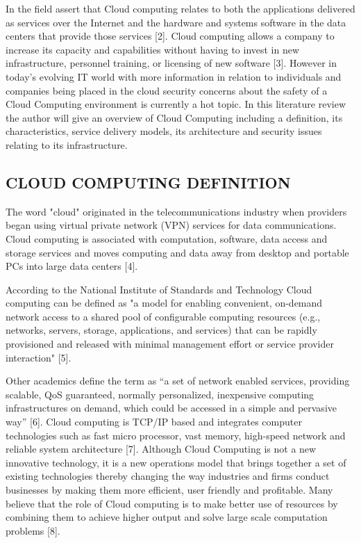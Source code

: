 \documentclass[10pt,journal,compsoc]{IEEEtran}
\begin{document}
\hfill 
 
\hfill 

\vspace{2mm}
In the field assert that Cloud computing relates to both the applications delivered as services over the Internet and the hardware and systems software in the data centers that provide those services [2]. Cloud computing allows a company to increase its capacity and capabilities without having to invest in new infrastructure, personnel training, or licensing of new software [3]. However in today’s evolving IT world with more information in relation to individuals and companies being placed in the cloud security concerns about the safety of a Cloud Computing environment is currently a hot topic. In this literature review the author will give an overview of Cloud Computing including a definition, its characteristics, service delivery models, its architecture and security issues relating to its infrastructure. 

\subsection{CLOUD COMPUTING DEFINITION}
The word "cloud" originated in the telecommunications industry when providers began using virtual private network (VPN) services for data communications. Cloud computing is associated with computation, software, data access and storage services and moves computing and data away from desktop and portable PCs into large data centers [4].

\vspace{2mm}
According to the National Institute of Standards and Technology Cloud computing can be defined as "a model for enabling convenient, on-demand network access to a shared pool of configurable computing resources (e.g., networks, servers, storage, applications, and services) that can be rapidly provisioned and released with minimal management effort or service provider interaction" [5]. 

\vspace{2mm}
Other academics define the term as “a set of network enabled services, providing scalable, QoS guaranteed, normally personalized, inexpensive computing infrastructures on demand, which could be accessed in a simple and pervasive way” [6]. Cloud computing is TCP/IP based and integrates computer technologies such as fast micro processor, vast memory, high-speed network and reliable system architecture [7]. Although Cloud Computing is not a new innovative technology, it is a new operations model that brings together a set of existing technologies thereby changing the way industries and firms conduct businesses by making them more efficient, user friendly and profitable.  Many believe that the role of Cloud computing is to make better use of resources by combining them to achieve higher output and solve large scale computation problems [8].
\end{document}
